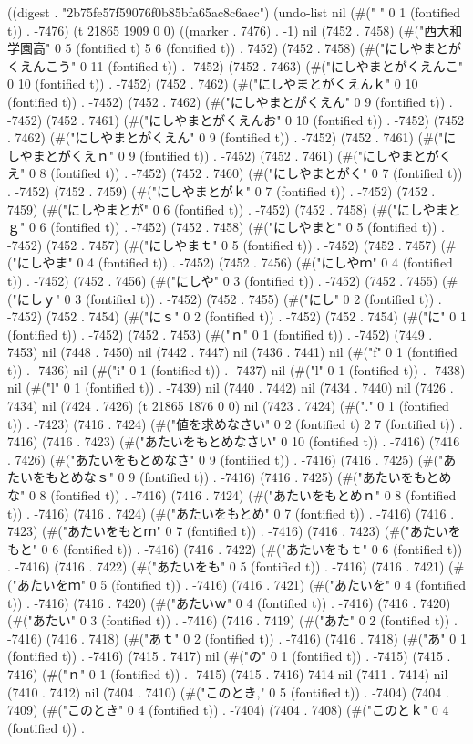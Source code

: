
((digest . "2b75fe57f59076f0b85bfa65ac8c6aec") (undo-list nil (#("
" 0 1 (fontified t)) . -7476) (t 21865 1909 0 0) ((marker . 7476) . -1) nil (7452 . 7458) (#("西大和学園高" 0 5 (fontified t) 5 6 (fontified t)) . 7452) (7452 . 7458) (#("にしやまとがくえんこう" 0 11 (fontified t)) . -7452) (7452 . 7463) (#("にしやまとがくえんこ" 0 10 (fontified t)) . -7452) (7452 . 7462) (#("にしやまとがくえんｋ" 0 10 (fontified t)) . -7452) (7452 . 7462) (#("にしやまとがくえん" 0 9 (fontified t)) . -7452) (7452 . 7461) (#("にしやまとがくえんお" 0 10 (fontified t)) . -7452) (7452 . 7462) (#("にしやまとがくえん" 0 9 (fontified t)) . -7452) (7452 . 7461) (#("にしやまとがくえｎ" 0 9 (fontified t)) . -7452) (7452 . 7461) (#("にしやまとがくえ" 0 8 (fontified t)) . -7452) (7452 . 7460) (#("にしやまとがく" 0 7 (fontified t)) . -7452) (7452 . 7459) (#("にしやまとがｋ" 0 7 (fontified t)) . -7452) (7452 . 7459) (#("にしやまとが" 0 6 (fontified t)) . -7452) (7452 . 7458) (#("にしやまとｇ" 0 6 (fontified t)) . -7452) (7452 . 7458) (#("にしやまと" 0 5 (fontified t)) . -7452) (7452 . 7457) (#("にしやまｔ" 0 5 (fontified t)) . -7452) (7452 . 7457) (#("にしやま" 0 4 (fontified t)) . -7452) (7452 . 7456) (#("にしやｍ" 0 4 (fontified t)) . -7452) (7452 . 7456) (#("にしや" 0 3 (fontified t)) . -7452) (7452 . 7455) (#("にしｙ" 0 3 (fontified t)) . -7452) (7452 . 7455) (#("にし" 0 2 (fontified t)) . -7452) (7452 . 7454) (#("にｓ" 0 2 (fontified t)) . -7452) (7452 . 7454) (#("に" 0 1 (fontified t)) . -7452) (7452 . 7453) (#("ｎ" 0 1 (fontified t)) . -7452) (7449 . 7453) nil (7448 . 7450) nil (7442 . 7447) nil (7436 . 7441) nil (#("f" 0 1 (fontified t)) . -7436) nil (#("i" 0 1 (fontified t)) . -7437) nil (#("l" 0 1 (fontified t)) . -7438) nil (#("l" 0 1 (fontified t)) . -7439) nil (7440 . 7442) nil (7434 . 7440) nil (7426 . 7434) nil (7424 . 7426) (t 21865 1876 0 0) nil (7423 . 7424) (#("." 0 1 (fontified t)) . -7423) (7416 . 7424) (#("値を求めなさい" 0 2 (fontified t) 2 7 (fontified t)) . 7416) (7416 . 7423) (#("あたいをもとめなさい" 0 10 (fontified t)) . -7416) (7416 . 7426) (#("あたいをもとめなさ" 0 9 (fontified t)) . -7416) (7416 . 7425) (#("あたいをもとめなｓ" 0 9 (fontified t)) . -7416) (7416 . 7425) (#("あたいをもとめな" 0 8 (fontified t)) . -7416) (7416 . 7424) (#("あたいをもとめｎ" 0 8 (fontified t)) . -7416) (7416 . 7424) (#("あたいをもとめ" 0 7 (fontified t)) . -7416) (7416 . 7423) (#("あたいをもとｍ" 0 7 (fontified t)) . -7416) (7416 . 7423) (#("あたいをもと" 0 6 (fontified t)) . -7416) (7416 . 7422) (#("あたいをもｔ" 0 6 (fontified t)) . -7416) (7416 . 7422) (#("あたいをも" 0 5 (fontified t)) . -7416) (7416 . 7421) (#("あたいをｍ" 0 5 (fontified t)) . -7416) (7416 . 7421) (#("あたいを" 0 4 (fontified t)) . -7416) (7416 . 7420) (#("あたいｗ" 0 4 (fontified t)) . -7416) (7416 . 7420) (#("あたい" 0 3 (fontified t)) . -7416) (7416 . 7419) (#("あた" 0 2 (fontified t)) . -7416) (7416 . 7418) (#("あｔ" 0 2 (fontified t)) . -7416) (7416 . 7418) (#("あ" 0 1 (fontified t)) . -7416) (7415 . 7417) nil (#("の" 0 1 (fontified t)) . -7415) (7415 . 7416) (#("ｎ" 0 1 (fontified t)) . -7415) (7415 . 7416) 7414 nil (7411 . 7414) nil (7410 . 7412) nil (7404 . 7410) (#("このとき," 0 5 (fontified t)) . -7404) (7404 . 7409) (#("このとき" 0 4 (fontified t)) . -7404) (7404 . 7408) (#("このとｋ" 0 4 (fontified t)) . 